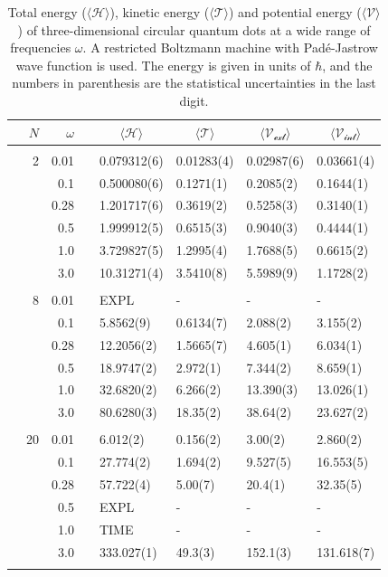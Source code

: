 \begin{table}
	\caption{Total energy ($\langle \mathcal{H}\rangle$), kinetic energy ($\langle\mathcal{T}\rangle$) and potential energy ($\langle \mathcal{V}\rangle$) of three-dimensional circular quantum dots at a wide range of frequencies $\omega$. A restricted Boltzmann machine with Padé-Jastrow wave function is used. The energy is given in units of $\hbar$, and the numbers in parenthesis are the statistical uncertainties in the last digit.}
	\label{tab:splitfrequencyQDRBMPJ3D}
	\begin{tabularx}{\textwidth}{R{1.5cm}rrcR{2.3cm}R{2.3cm}R{2.3cm}R{2.3cm}} \hline\hline
		& & $\omega$ &&  &  &  &  \\ \hline \\
		&2 & 0.01 && 0.079312(6) & 0.01283(4) & 0.02987(6) & 0.03661(4) \\
		&& 0.1 && 0.500080(6) & 0.1271(1) & 0.2085(2) & 0.1644(1) \\
		&& 0.28 && 1.201717(6) & 0.3619(2) & 0.5258(3) & 0.3140(1) \\
		&& 0.5 && 1.999912(5) & 0.6515(3) & 0.9040(3) & 0.4444(1) \\
		&& 1.0 && 3.729827(5) & 1.2995(4) & 1.7688(5) & 0.6615(2) \\
		&& 3.0 && 10.31271(4) & 3.5410(8) & 5.5989(9) & 1.1728(2) \\ \hdashline \\
		
		&8 & 0.01 && EXPL & - & - & - \\
		&& 0.1 && 5.8562(9) & 0.6134(7) & 2.088(2) & 3.155(2) \\
		&& 0.28 && 12.2056(2) & 1.5665(7) & 4.605(1) & 6.034(1) \\
		&& 0.5 && 18.9747(2) & 2.972(1) & 7.344(2) & 8.659(1) \\
		&& 1.0 && 32.6820(2) & 6.266(2) & 13.390(3) & 13.026(1) \\
		&& 3.0 && 80.6280(3) & 18.35(2) & 38.64(2) & 23.627(2) \\ \hdashline \\
		
		&20 & 0.01 && 6.012(2) & 0.156(2) & 3.00(2) & 2.860(2) \\
		&& 0.1 && 27.774(2) & 1.694(2) & 9.527(5) & 16.553(5) \\
		&& 0.28 && 57.722(4) & 5.00(7) & 20.4(1) & 32.35(5) \\
		&& 0.5 && EXPL & - & - & - \\
		&& 1.0 && TIME & - & - & - \\
		&& 3.0 && 333.027(1) & 49.3(3) & 152.1(3) & 131.618(7) \\ \hdashline \\
		

\end{tabularx}
\end{table}
